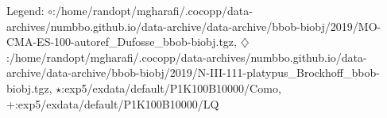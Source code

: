 Legend: {\color{CornflowerBlue}$\circ$}:/home/randopt/mgharafi/.cocopp/data-archives/numbbo.github.io/data-archive/data-archive/bbob-biobj/2019/MO-CMA-ES-100-autoref\_Dufosse\_bbob-biobj.tgz, {\color{Orange}$\diamondsuit$}:/home/randopt/mgharafi/.cocopp/data-archives/numbbo.github.io/data-archive/data-archive/bbob-biobj/2019/N-III-111-platypus\_Brockhoff\_bbob-biobj.tgz, {\color{Green}$\star$}:exp5/exdata/default/P1K100B10000/Como, {\color{red}+}:exp5/exdata/default/P1K100B10000/LQ